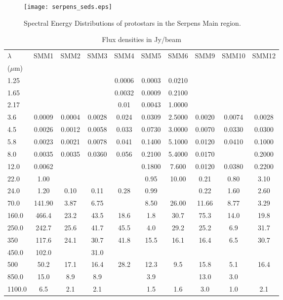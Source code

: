 \documentclass{aa}
\begin{document}
\begin{appendix}
\begin{figure} 
\texttt{[image: serpens\_seds.eps]} 
\caption{Spectral Energy Distributions of protostars in the Serpens Main region.} 
\label{seds} 
\end{figure}

\begin{table*} 
\caption{Flux densities in Jy/beam}      
\centering       %
\label{SED_data}    

\begin{tabular}{l c c c c c c c c c} 
\hline 
$\lambda$ & SMM1  & SMM2  & SMM3 & SMM4 & SMM5  & SMM6 & SMM9 & SMM10 & SMM12 \\ 
($\mu$m) &  &  &  & & & & & & \\ 
\hline 
1.25 & & & & 0.0006 & 0.0003 & 0.0210 & & &\\
1.65 & & & & 0.0032 & 0.0009 & 0.2100 & & &\\
2.17 & & & & 0.01 & 0.0043 & 1.0000 & & &\\
3.6 & 0.0009 & 0.0004 & 0.0028 & 0.024 & 0.0309 & 2.5000 & 0.0020 & 0.0074 & 0.0028\\ 
4.5 & 0.0026 & 0.0012 & 0.0058 & 0.033 & 0.0730 & 3.0000 & 0.0070 & 0.0330 & 0.0300\\ 
5.8 & 0.0023 & 0.0021 & 0.0078 & 0.041 & 0.1400 & 5.1000 & 0.0120 & 0.0410 & 0.1000\\
8.0 & 0.0035 & 0.0035 & 0.0360 & 0.056 & 0.2100 & 5.4000 & 0.0170 & & 0.2000\\ 
12.0 & 0.0062 &  &  & & 0.1800 & 7.600 & 0.0120 & 0.0380 & 0.2200\\ 
22.0 & 1.00 &  &  & & 0.95 & 10.00 & 0.21 & 0.80 & 3.10\\ 
24.0 & 1.20 & 0.10 & 0.11 & 0.28 & 0.99 & & 0.22 & 1.60 & 2.60\\
70.0 & 141.90 & 3.87 & 6.75 &  & 8.50 & 26.00 & 11.66 & 8.77 & 3.29\\
160.0 & 466.4 & 23.2 & 43.5 & 18.6 & 1.8 & 30.7 & 75.3 & 14.0 & 19.8\\
250.0 &  242.7 & 25.6 & 41.7 & 45.5 & 4.0 & 29.2 & 25.2 & 6.9 & 31.7\\
350 & 117.6 & 24.1 & 30.7 & 41.8 & 15.5 & 16.1 & 16.4 & 6.5 & 30.7\\
450.0 & 102.0 &  & 31.0 & & & & & &\\
500 & 50.2 & 17.1 & 16.4 & 28.2 & 12.3 & 9.5 & 15.8 & 5.1 & 16.4\\
850.0 & 15.0 & 8.9 & 8.9 & & 3.9 & & 13.0 & 3.0 &\\
1100.0 & 6.5 & 2.1 & 2.1 & & 1.5 & 1.6 & 3.0 & 1.0 & 2.1\\
\hline \end{tabular} 
\end{table*}


\end{appendix}
\end{document}
